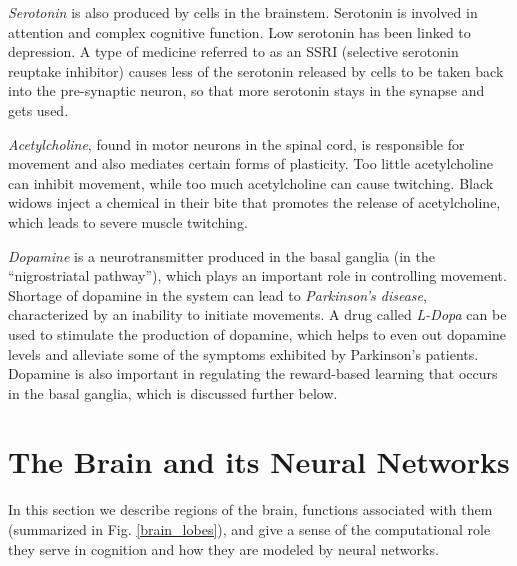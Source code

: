 \emph{Serotonin} is also produced by cells in the brainstem. Serotonin is involved in attention and complex cognitive function. Low serotonin has been linked to depression. A type of medicine referred to as an SSRI (selective serotonin reuptake inhibitor) causes less of the serotonin released by cells to be taken back into the pre-synaptic neuron, so that more serotonin stays in the synapse and gets used. 

\emph{Acetylcholine}, found in motor neurons in the spinal cord, is responsible for movement and also mediates certain forms of plasticity. Too little acetylcholine can inhibit movement, while too much acetylcholine can cause twitching. Black widows inject a chemical in their bite that promotes the release of acetylcholine, which leads to severe muscle twitching.

		
\emph{Dopamine} is a neurotransmitter produced in the basal ganglia (in the ``nigrostriatal pathway''), which plays an important role in controlling movement. Shortage of dopamine in the system can lead to \emph{Parkinson's disease}, characterized by an inability to initiate movements. A drug called \emph{L-Dopa} can be used to stimulate the production of dopamine, which helps to even out dopamine levels and alleviate some of the symptoms exhibited by Parkinson's patients. Dopamine is also important in regulating the reward-based learning that occurs in the basal ganglia, which is discussed further below. 

\section{The Brain and its Neural Networks}

In this section we describe regions of the brain, functions associated with them (summarized in Fig. \ref{brain_lobes}), and give a sense of the computational role they serve in cognition and how they are modeled by neural networks.


